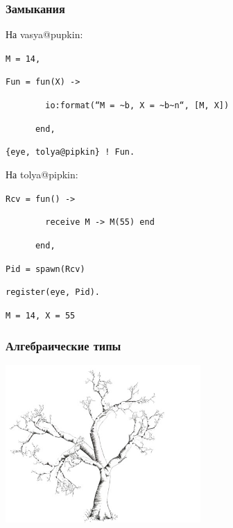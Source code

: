 \documentclass{beamer}
\begin{document}
\begin{frame}[fragile]
  \frametitle{Замыкания}
  \pause
  На vasya@pupkin:

  \begin{block}{}
    \texttt{M = 14,}

    \texttt{Fun = {\color{magenta}fun}(X) ->}

    \verb+        +\texttt{{\color{magenta}io:format}({\color{orange}``M = \~{}b, X = \~{}b\~{}n``}, [M, X])}

    \verb+      +\texttt{{\color{magenta}end},}

    \texttt{\{eye, {\color{blue}tolya@pipkin}\} ! Fun.}

  \end{block}
  \pause

  На tolya@pipkin:

  \begin{block}{}
    \texttt{Rcv = {\color{magenta}fun}() ->}

    \verb+        +\texttt{{\color{magenta}receive} M -> M(55) {\color{magenta}end}}

    \verb+      +\texttt{{\color{magenta}end},}

    \texttt{Pid = {\color{magenta}spawn}(Rcv)}

    \texttt{{\color{magenta}register}(eye, Pid).}

  \end{block}

  \pause

  \begin{block}{}
    \texttt{M = 14, X = 55}
  \end{block}




\end{frame}


\begin{frame}
  \frametitle{Алгебраические типы}
  \begin{center}
    \includegraphics[height=6cm]{tree.png}
  \end{center}
\end{frame}
\end{document}
